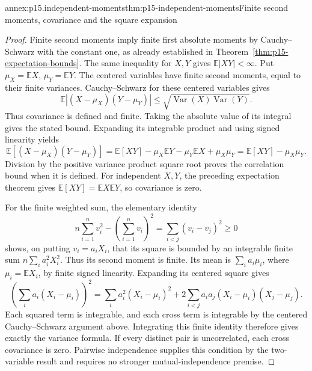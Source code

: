 \begin{annexitem}{annex:p15.independent-moments}{thm:p15-independent-moments}{Finite second moments, covariance and the square expansion}
\begin{proof}
Finite second moments imply finite first absolute moments by
Cauchy--Schwarz with the constant one, as already established in
Theorem~\ref{thm:p15-expectation-bounds}. The same inequality for
\(X,Y\) gives \(\mathbb E|XY|<\infty\).
Put \(\mu_X=\mathbb E X\), \(\mu_Y=\mathbb E Y\).
The centered variables have finite second moments, equal to their
finite variances. Cauchy--Schwarz for these centered variables gives
\[
 \mathbb E|(X-\mu_X)(Y-\mu_Y)|
       \leq\sqrt{\operatorname{Var}(X)\operatorname{Var}(Y)}.
\]
Thus covariance is defined and finite. Taking the absolute value
of its integral gives the stated bound. Expanding its integrable
product and using signed linearity yields
\[
 \mathbb E[(X-\mu_X)(Y-\mu_Y)]
    =\mathbb E[XY]-\mu_X\mathbb E Y-\mu_Y\mathbb E X+\mu_X\mu_Y
    =\mathbb E[XY]-\mu_X\mu_Y.
\]
Division by the positive variance product square root proves the
correlation bound when it is defined. For independent \(X,Y\),
the preceding expectation theorem gives
\(\mathbb E[XY]=\mathbb E X\mathbb E Y\), so covariance is zero.

For the finite weighted sum, the elementary identity
\[
 n\sum_{i=1}^n v_i^2-\left(\sum_{i=1}^n v_i\right)^2
                         =\sum_{i<j}(v_i-v_j)^2\geq0
\]
shows, on putting \(v_i=a_iX_i\), that its square is bounded
by an integrable finite sum \(n\sum_i a_i^2X_i^2\).
Thus its second moment is finite. Its mean is \(\sum_i a_i\mu_i\),
where \(\mu_i=\mathbb E X_i\), by finite signed linearity.
Expanding its centered square gives
\[
 \left(\sum_i a_i(X_i-\mu_i)\right)^2
   =\sum_i a_i^2(X_i-\mu_i)^2
       +2\sum_{i<j}a_ia_j(X_i-\mu_i)(X_j-\mu_j).
\]
Each squared term is integrable, and each cross term is integrable
by the centered Cauchy--Schwarz argument above. Integrating this
finite identity therefore gives exactly the variance formula.
If every distinct pair is uncorrelated, each cross covariance is
zero. Pairwise independence supplies this condition by the two-variable
result and requires no stronger mutual-independence premise.
\end{proof}
\end{annexitem}

